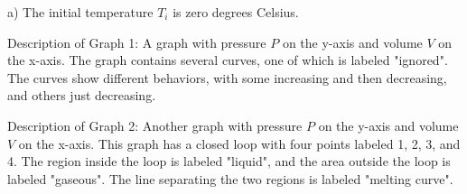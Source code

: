a) The initial temperature \( T_i \) is zero degrees Celsius.

Description of Graph 1: A graph with pressure \( P \) on the y-axis and volume \( V \) on the x-axis. The graph contains several curves, one of which is labeled "ignored". The curves show different behaviors, with some increasing and then decreasing, and others just decreasing.

Description of Graph 2: Another graph with pressure \( P \) on the y-axis and volume \( V \) on the x-axis. This graph has a closed loop with four points labeled 1, 2, 3, and 4. The region inside the loop is labeled "liquid", and the area outside the loop is labeled "gaseous". The line separating the two regions is labeled "melting curve".